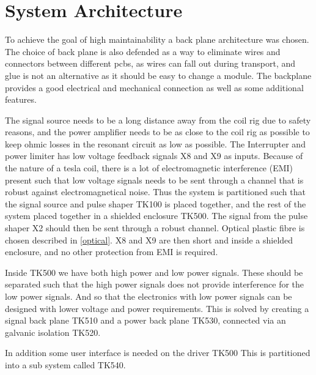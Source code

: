 \section{System Architecture}
\label{sa}
To achieve the goal of high maintainability a back plane architecture was chosen. The choice of back plane is also defended as a way to eliminate wires and connectors between different pcbs, as wires can fall out during transport, and glue is not an alternative as it should be easy to change a module. The backplane provides a good electrical and mechanical connection as well as some additional features. 

The signal source needs to be a long distance away from the coil rig due to safety reasons, and the power amplifier needs to be as close to the coil rig as possible to keep ohmic losses in the resonant circuit as low as possible. The Interrupter and power limiter has low voltage feedback signals X8 and X9 as inputs. Because of the nature of a tesla coil, there is a lot of electromagnetic interference (EMI) present such that low voltage signals needs to be sent through a channel that is robust against electromagnetical noise. Thus the system is partitioned such that the signal source and pulse shaper TK100 is placed together, and the rest of the system placed together in a shielded enclosure TK500. The signal from the pulse shaper X2 should then be sent through a robust channel. Optical plastic fibre is chosen described in \cref{optical}. X8 and X9 are then short and inside a shielded enclosure, and no other protection from EMI is required.

Inside TK500 we have both high power and low power signals. These should be separated such that the high power signals does not provide interference for the low power signals. And so that the electronics with low power signals can be designed with lower voltage and power requirements. This is solved by creating a signal back plane TK510 and a power back plane TK530, connected via an galvanic isolation TK520.

In addition some user interface is needed on the driver TK500 This is partitioned into a sub system called TK540.


 
